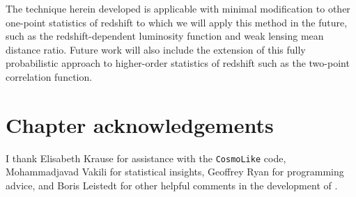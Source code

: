 The technique herein developed is applicable with minimal modification to other one-point statistics of redshift to which we will apply this method in the future, such as the redshift-dependent luminosity function and weak lensing mean distance ratio.  
Future work will also include the extension of this fully probabilistic approach to higher-order statistics of redshift such as the two-point correlation function.

\section*{Chapter acknowledgements}

I thank Elisabeth Krause for assistance with the \texttt{CosmoLike} code, Mohammadjavad Vakili for statistical insights, Geoffrey Ryan for programming advice, and Boris Leistedt for other helpful comments in the development of \Chippr.
